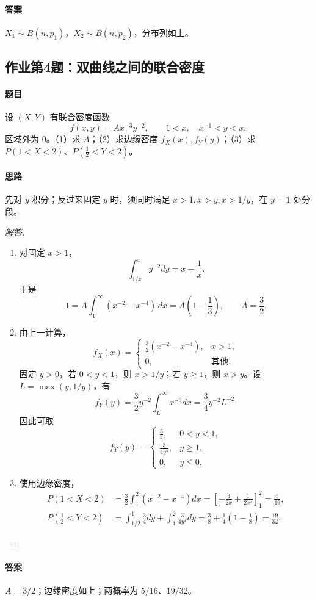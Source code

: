 \paragraph{答案}$X_1\sim B(n,p_1)$，$X_2\sim B(n,p_2)$，分布列如上。

\subsection{作业第4题：双曲线之间的联合密度}\label{ex:w10-h4}
\paragraph{题目}
设 $(X,Y)$ 有联合密度函数
\[
f(x,y)=Ax^{-3}y^{-2},\qquad 1<x,\quad x^{-1}<y<x,
\]
区域外为 $0$。（1）求 $A$；（2）求边缘密度 $f_X(x),f_Y(y)$；（3）求 $P(1<X<2)$、$P(\frac12<Y<2)$。
\paragraph{思路}先对 $y$ 积分；反过来固定 $y$ 时，须同时满足 $x>1,x>y,x>1/y$，在 $y=1$ 处分段。
\begin{proof}[解答]
\begin{enumerate}
\item 对固定 $x>1$，
\[
\int_{1/x}^xy^{-2}dy=x-\frac1x.
\]
于是
\[
1=A\int_1^\infty(x^{-2}-x^{-4})\,dx=A\left(1-\frac13\right),
\qquad A=\frac32.
\]
\item 由上一计算，
\[
f_X(x)=\begin{cases}\frac32(x^{-2}-x^{-4}),&x>1,\\0,&\text{其他}.\end{cases}
\]
固定 $y>0$，若 $0<y<1$，则 $x>1/y$；若 $y\geq1$，则 $x>y$。设 $L=\max(y,1/y)$，有
\[
f_Y(y)=\frac32y^{-2}\int_L^\infty x^{-3}dx=\frac34y^{-2}L^{-2}.
\]
因此可取
\[
f_Y(y)=\begin{cases}\frac34,&0<y<1,\\\frac3{4y^4},&y\geq1,\\0,&y\leq0.\end{cases}
\]
\item 使用边缘密度，
\begin{align*}
P(1<X<2)&=\frac32\int_1^2(x^{-2}-x^{-4})dx
=\left[-\frac3{2x}+\frac1{2x^3}\right]_1^2=\frac5{16},\\
P\left(\frac12<Y<2\right)
&=\int_{1/2}^1\frac34dy+\int_1^2\frac3{4y^4}dy
=\frac38+\frac14\left(1-\frac18\right)=\frac{19}{32}.
\end{align*}
\end{enumerate}
\end{proof}
\paragraph{答案}$A=3/2$；边缘密度如上；两概率为 $5/16$、$19/32$。
